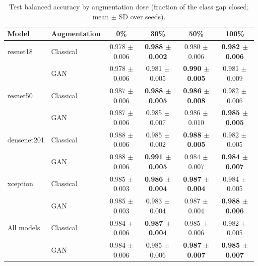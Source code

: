 \begin{table}[htbp]
\centering
\caption{Test balanced accuracy by augmentation dose (fraction of the class gap closed; mean $\pm$ SD over seeds).}
\label{tab:dose_balanced_accuracy}
\begin{tabular}{llcccc}
\toprule
Model & Augmentation & 0\% & 30\% & 50\% & 100\% \\
\midrule
resnet18 & Classical & 0.978 $\pm$ 0.006 & \textbf{0.988 $\pm$ 0.002} & 0.980 $\pm$ 0.006 & \textbf{0.982 $\pm$ 0.006} \\
 & GAN & 0.978 $\pm$ 0.006 & 0.981 $\pm$ 0.005 & \textbf{0.990 $\pm$ 0.005} & 0.981 $\pm$ 0.009 \\
\addlinespace
resnet50 & Classical & 0.987 $\pm$ 0.006 & \textbf{0.988 $\pm$ 0.005} & \textbf{0.986 $\pm$ 0.008} & 0.982 $\pm$ 0.006 \\
 & GAN & 0.987 $\pm$ 0.006 & 0.985 $\pm$ 0.007 & 0.986 $\pm$ 0.010 & \textbf{0.985 $\pm$ 0.005} \\
\addlinespace
densenet201 & Classical & 0.988 $\pm$ 0.006 & 0.985 $\pm$ 0.002 & \textbf{0.988 $\pm$ 0.005} & 0.982 $\pm$ 0.005 \\
 & GAN & 0.988 $\pm$ 0.006 & \textbf{0.991 $\pm$ 0.005} & 0.984 $\pm$ 0.007 & \textbf{0.984 $\pm$ 0.007} \\
\addlinespace
xception & Classical & 0.985 $\pm$ 0.003 & \textbf{0.986 $\pm$ 0.004} & \textbf{0.987 $\pm$ 0.004} & 0.984 $\pm$ 0.005 \\
 & GAN & 0.985 $\pm$ 0.003 & 0.983 $\pm$ 0.004 & 0.987 $\pm$ 0.004 & \textbf{0.988 $\pm$ 0.006} \\
\addlinespace
All models & Classical & 0.984 $\pm$ 0.006 & \textbf{0.987 $\pm$ 0.004} & 0.985 $\pm$ 0.006 & 0.982 $\pm$ 0.005 \\
 & GAN & 0.984 $\pm$ 0.006 & 0.985 $\pm$ 0.006 & \textbf{0.987 $\pm$ 0.007} & \textbf{0.985 $\pm$ 0.007} \\
\bottomrule
\end{tabular}
\end{table}